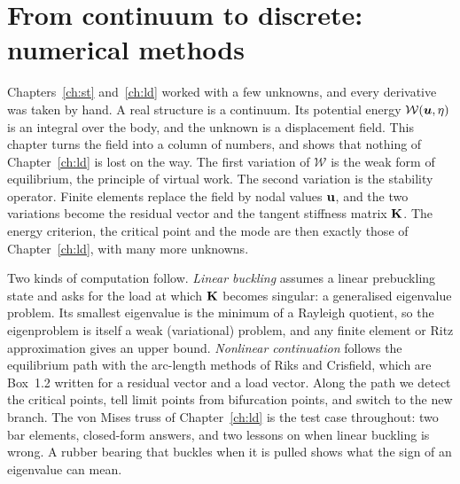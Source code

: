 \chapter{From continuum to discrete: numerical methods}\label{ch:nc}

Chapters~\ref{ch:st} and~\ref{ch:ld} worked with a few unknowns, and every
derivative was taken by hand. A real structure is a continuum. Its potential
energy $\mathcal{W}(\bm{u},\eta)$ is an integral over the body, and the unknown is a
displacement field. This chapter turns the field into a column of numbers, and
shows that nothing of Chapter~\ref{ch:ld} is lost on the way. The first variation of
$\mathcal{W}$ is the weak form of equilibrium, the principle of virtual work. The
second variation is the stability operator. Finite elements replace the field by
nodal values $\mathbf{u}$, and the two variations become the residual vector and the
tangent stiffness matrix $\mathbf{K}$. The energy criterion, the critical point and the
mode are then exactly those of Chapter~\ref{ch:ld}, with many more unknowns.

Two kinds of computation follow. \emph{Linear buckling} assumes a linear prebuckling
state and asks for the load at which $\mathbf{K}$ becomes singular: a generalised
eigenvalue problem. Its smallest eigenvalue is the minimum of a Rayleigh quotient,
so the eigenproblem is itself a weak (variational) problem, and any finite element
or Ritz approximation gives an upper bound. \emph{Nonlinear continuation} follows the
equilibrium path with the arc-length methods of Riks and Crisfield, which are
Box~1.2 written for a residual vector and a load vector. Along the
path we detect the critical points, tell limit points from bifurcation points, and
switch to the new branch. The von Mises truss of Chapter~\ref{ch:ld} is the test case
throughout: two bar elements, closed-form answers, and two lessons on when linear
buckling is wrong. A rubber bearing that buckles when it is pulled shows what the
sign of an eigenvalue can mean.

